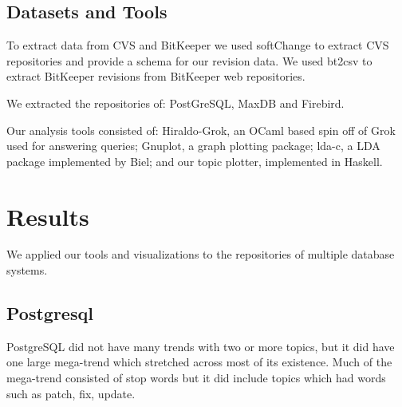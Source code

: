 \documentclass[times, 10pt,twocolumn]{article}
\begin{document}
\subsection{Datasets and Tools}

To extract data from CVS and BitKeeper we used softChange to extract
CVS repositories and provide a schema for our revision data. We used
bt2csv to extract BitKeeper revisions from BitKeeper web repositories.

We extracted the repositories of: PostGreSQL, MaxDB and
Firebird.


Our analysis tools consisted of: Hiraldo-Grok, an OCaml based spin off
of Grok used for answering queries; Gnuplot, a graph plotting package;
lda-c, a LDA package implemented by Biel; and our topic plotter,
implemented in Haskell.















\section{Results}

We applied our tools and visualizations to the repositories of
multiple database systems. 

\subsection{Postgresql}

PostgreSQL did not have many trends with two or more topics, but it
did have one large mega-trend which stretched across most of its
existence. Much of the mega-trend consisted of stop words but it did
include topics which had words such as patch, fix, update.
\end{document}
